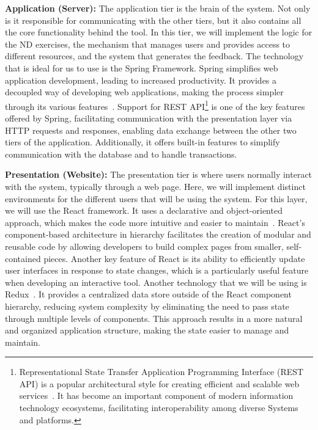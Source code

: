 \textbf{Application (Server):} The application tier is the brain of the system. Not only is it responsible for communicating with the other tiers, but it also contains all the core functionality behind the tool. In this tier, we will implement the logic for the \gls{ND} exercises, the mechanism that manages users and provides access to different resources, and the system that generates the feedback. The technology that is ideal for us to use is the Spring Framework. Spring simplifies web application development, leading to increased productivity. It provides a decoupled way of developing web applications, making the process simpler through its various features~\cite{wali_2019_rapid}. Support for REST API\footnote{Representational State Transfer Application Programming Interface (REST API) is a popular architectural style for creating efficient and scalable web services~\cite{daruprasetyawan_2024_pengembangan}. It has become an important component of modern information technology ecosystems, facilitating interoperability among diverse Systems and platforms.} is one of the key features offered by Spring, facilitating communication with the presentation layer via HTTP requests and responses, enabling data exchange between the other two tiers of the application. Additionally, it offers built-in features to simplify communication with the database and to handle transactions.


\textbf{Presentation (Website):} The presentation tier is where users normally interact with the system, typically through a web page. Here, we will implement distinct environments for the different users that will be using the system. For this layer, we will use the React framework. It uses a declarative and object-oriented approach, which makes the code more intuitive and easier to maintain~\cite{madsen_a}. React's component-based architecture in hierarchy facilitates the creation of modular and reusable code by allowing developers to build complex pages from smaller, self-contained pieces. Another key feature of React is its ability to efficiently update user interfaces in response to state changes, which is a particularly useful feature when developing an interactive tool. Another technology that we will be using is Redux~\cite{freeman_2019_using}. It provides a centralized data store outside of the React component hierarchy, reducing system complexity by eliminating the need to pass state through multiple levels of components. This approach results in a more natural and organized application structure, making the state easier to manage and maintain.


